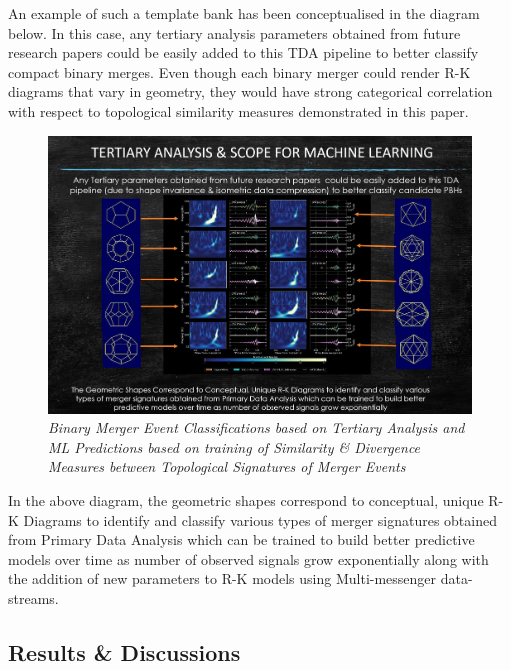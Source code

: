 An example of such a template bank has been conceptualised in the diagram below. In this case, any tertiary analysis  parameters obtained from future research papers could be easily added to this TDA pipeline  to better classify compact binary merges. Even though each binary merger could render R-K diagrams that vary in geometry, they would have strong categorical correlation with respect to topological similarity measures demonstrated in this paper.
 

 \begin{figure}[H]
	\centering
	\includegraphics[width=1.0\linewidth]{images/79_Tertiary Analysis & ML Predictions.jpg}
	\caption{\textit{Binary Merger Event Classifications based on Tertiary Analysis and ML Predictions based on training of Similarity \& Divergence Measures between Topological Signatures of Merger Events }}
	\label{fig:LIGO18_PlaceHolder_fig}
\end{figure}

In the above diagram, the geometric shapes correspond to conceptual, unique R-K Diagrams to identify and classify various types of merger signatures obtained from Primary Data Analysis which can be trained to build better predictive models over time as number of observed signals grow exponentially along with the addition of new parameters to R-K models using Multi-messenger data-streams. 


\subsection{Results \& Discussions}

